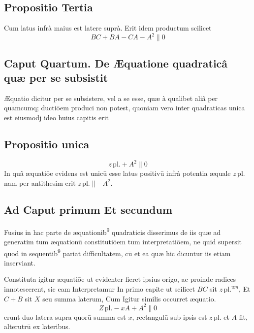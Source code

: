 \documentclass[11pt,a4paper]{article}
\begin{document}
\subsection*{Propositio Tertia}

Cum latus infrà maius est latere suprà. Erit idem productum scilicet
\[ BC + BA - CA - A^{2} \parallel 0 \]

\subsection*{Caput Quartum. De Æquatione quadraticâ quæ per se subsistit}

Æquatio dicitur per se subsistere, vel a se esse, quæ à qualibet aliâ per quamcumq; ductiōem produci non potest, quoniam vero inter quadraticas unica est eiusmodj ideo huius capitis erit

\subsection*{Propositio unica}

\[ z\,\mathrm{pl.} + A^{2} \parallel 0 \]
In quâ æquatiōe evidens est unicū esse latus positivū infrà potentia æquale $z\,\mathrm{pl.}$ nam per antithesim erit $z\,\mathrm{pl.} \parallel -A^{2}$.

\subsection*{Ad Caput primum Et secundum}

Fusius in hac parte de æquationib\textsuperscript{9} quadraticis disserimus de iis quæ ad generatim tum æquationū constitutiōem tum interpretatiōem, ne quid supersit quod in sequentib\textsuperscript{9} pariat difficultatem, cū et ea quæ hic dicuntur iis etiam inserviant.

Constituta igitur æquatiōe ut evidenter fieret ipsius origo, ac proinde radices innotescerent, sic eam Interpretamur In primo capite ut scilicet $BC$ sit $z\,\mathrm{pl.}^{um}$, Et $C + B$ sit $X$ seu summa laterum, Cum Igitur similis occurret æquatio.
\[ Z\,\mathrm{pl.} - xA + A^{2} \parallel 0 \]
erunt duo latera supra quorū summa est $x$, rectangulū sub ipsis est $z\,\mathrm{pl.}$ et $A$ fit, alterutrū ex lateribus.
\end{document}
